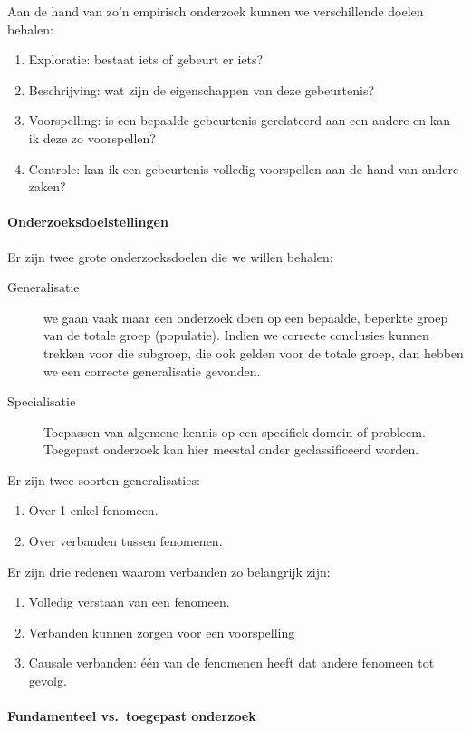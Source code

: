 Aan de hand van zo'n empirisch onderzoek kunnen we verschillende doelen behalen:
\begin{enumerate}
	\item Exploratie: bestaat iets of gebeurt er iets?
	\item Beschrijving: wat zijn de eigenschappen van deze gebeurtenis?
	\item Voorspelling: is een bepaalde gebeurtenis gerelateerd aan een andere en kan ik deze zo voorspellen?
	\item Controle: kan ik een gebeurtenis volledig voorspellen aan de hand van andere zaken?
\end{enumerate}


\paragraph{Onderzoeksdoelstellingen}

Er zijn twee grote onderzoeksdoelen die we willen behalen:

\begin{description}
  \item [Generalisatie] we gaan vaak maar een onderzoek doen op een bepaalde, beperkte groep van de totale groep (populatie). Indien we correcte conclusies kunnen trekken voor die subgroep, die ook gelden voor de totale groep, dan hebben we een correcte generalisatie gevonden.
  \item[Specialisatie] Toepassen van algemene kennis op een specifiek domein of probleem. Toegepast onderzoek kan hier meestal onder geclassificeerd worden.
\end{description}

Er zijn twee soorten generalisaties:
\begin{enumerate}
	\item Over 1 enkel fenomeen.
	\item Over verbanden tussen fenomenen.
\end{enumerate}
Er zijn drie redenen waarom verbanden zo belangrijk zijn:
\begin{enumerate}
	\item Volledig verstaan van een fenomeen. 
	\item Verbanden kunnen zorgen voor een voorspelling
	\item Causale verbanden: één van de fenomenen heeft dat andere fenomeen tot gevolg. 
\end{enumerate}

\paragraph{Fundamenteel vs.~toegepast onderzoek}


